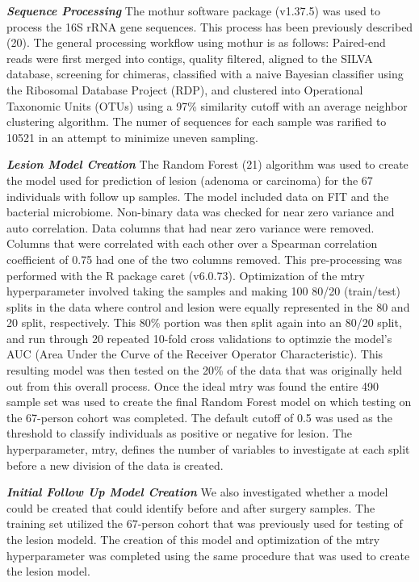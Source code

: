 \documentclass[12pt,]{article}
\begin{document}
\textbf{\emph{Sequence Processing}} The mothur software package
(v1.37.5) was used to process the 16S rRNA gene sequences. This process
has been previously described (20). The general processing workflow
using mothur is as follows: Paired-end reads were first merged into
contigs, quality filtered, aligned to the SILVA database, screening for
chimeras, classified with a naive Bayesian classifier using the
Ribosomal Database Project (RDP), and clustered into Operational
Taxonomic Units (OTUs) using a 97\% similarity cutoff with an average
neighbor clustering algorithm. The numer of sequences for each sample
was rarified to 10521 in an attempt to minimize uneven sampling.

\textbf{\emph{Lesion Model Creation}} The Random Forest (21) algorithm
was used to create the model used for prediction of lesion (adenoma or
carcinoma) for the 67 individuals with follow up samples. The model
included data on FIT and the bacterial microbiome. Non-binary data was
checked for near zero variance and auto correlation. Data columns that
had near zero variance were removed. Columns that were correlated with
each other over a Spearman correlation coefficient of 0.75 had one of
the two columns removed. This pre-processing was performed with the R
package caret (v6.0.73). Optimization of the mtry hyperparameter
involved taking the samples and making 100 80/20 (train/test) splits in
the data where control and lesion were equally represented in the 80 and
20 split, respectively. This 80\% portion was then split again into an
80/20 split, and run through 20 repeated 10-fold cross validations to
optimzie the model's AUC (Area Under the Curve of the Receiver Operator
Characteristic). This resulting model was then tested on the 20\% of the
data that was originally held out from this overall process. Once the
ideal mtry was found the entire 490 sample set was used to create the
final Random Forest model on which testing on the 67-person cohort was
completed. The default cutoff of 0.5 was used as the threshold to
classify individuals as positive or negative for lesion. The
hyperparameter, mtry, defines the number of variables to investigate at
each split before a new division of the data is created.

\textbf{\emph{Initial Follow Up Model Creation}} We also investigated
whether a model could be created that could identify before and after
surgery samples. The training set utilized the 67-person cohort that was
previously used for testing of the lesion modeld. The creation of this
model and optimization of the mtry hyperparameter was completed using
the same procedure that was used to create the lesion model.
\end{document}
